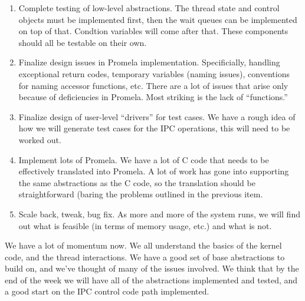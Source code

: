 \begin{enumerate}
\item Complete testing of low-level abstractions.  The thread state
and control objects must be implemented first, then the wait queues
can be implemented on top of that.  Condtion variables will come after
that.  These components should all be testable on their own.

\item Finalize design issues in Promela implementation.  Specificially,
handling exceptional return codes, temporary variables (naming
issues), conventions for naming accessor functions, etc.  There are a
lot of issues that arise only because of deficiencies in Promela.
Most striking is the lack of ``functions.''

\item Finalize design of user-level ``drivers'' for test cases.  We
have a rough idea of how we will generate test cases for the IPC
operations, this will need to be worked out.

\item Implement lots of Promela.  We have a lot of C code that needs
to be effectively translated into Promela.  A lot of work has gone
into supporting the same abstractions as the C code, so the
translation should be straightforward (baring the problems outlined in
the previous item.

\item Scale back, tweak, bug fix.  As more and more of the system
runs, we will find out what is feasible (in terms of memory usage,
etc.) and what is not.
\end{enumerate}

We have a lot of momentum now.  We all understand the basics of the
kernel code, and the thread interactions.  We have a good set of base
abstractions to build on, and we've thought of many of the issues
involved.  We think that by the end of the week we will have all of
the abstractions implemented and tested, and a good start on the IPC
control code path implemented.

